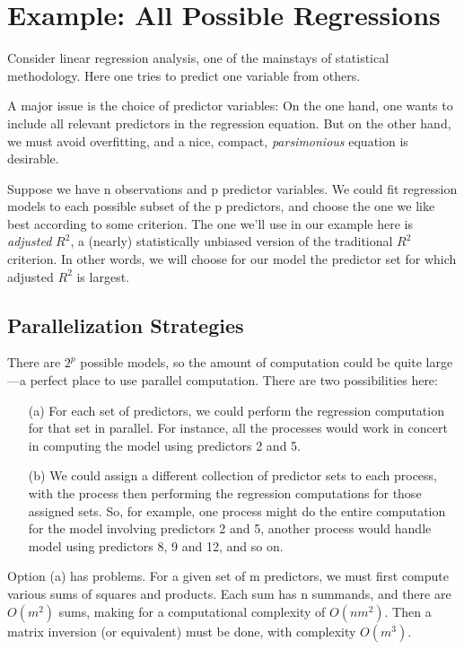 \section{Example:  All Possible Regressions}

Consider linear regression analysis, one of the mainstays of statistical
methodology.  Here one tries to predict one variable from others.

A major issue is the choice of predictor variables:  On
the one hand, one wants to include all relevant predictors in the
regression equation.  But on the other hand, we must avoid overfitting,
and a nice, compact, {\it parsimonious} equation is desirable.

Suppose we have n observations and p predictor variables.  We could fit
regression models to each possible subset of the p predictors, and
choose the one we like best according to some criterion.  The one we'll
use in our example here is {\it adjusted} $R^2$, a (nearly)
statistically unbiased version of the traditional $R^2$ criterion.  In
other words, we will choose for our model the predictor set for which
adjusted $R^2$ is largest.

\subsection{Parallelization Strategies}

There are $2^p$ possible models, so the amount of computation could be
quite large---a perfect place to use parallel computation.  There are
two possibilities here:

\begin{itemize}

\item [(a)] For each set of predictors, we could perform the regression
computation for that set in parallel.  For instance, all the processes
would work in concert in computing the model using predictors 2 and 5.

\item [(b)] We could assign a different collection of predictor sets to
each process, with the process then performing the regression
computations for those assigned sets.  So, for example, one process
might do the entire computation for the model involving predictors 2 and
5, another process would handle model using predictors 8, 9 and 12, and
so on.

\end{itemize}

Option (a) has problems.  For a given set of m predictors, we must first
compute various sums of squares and products.  Each sum has n summands,
and there are $O(m^2)$ sums, making for a computational complexity of
$O(nm^2)$.  Then a matrix inversion (or equivalent) must be done, with
complexity $O(m^3)$.  

